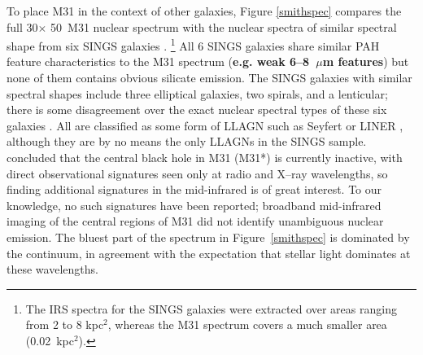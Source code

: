 To place M31 in the context of other galaxies,
Figure \ref{smithspec} compares the full 30\arcsec $\times$ 50\arcsec\ M31 nuclear spectrum with the 
nuclear spectra of similar spectral shape from six SINGS galaxies \citep{Smith:2007lr}.%
\footnote{The IRS spectra for the SINGS galaxies were extracted over areas ranging from 2 to 8 kpc$^2$, whereas the M31 spectrum covers a much smaller area (0.02~kpc$^2$).}
All 6 SINGS galaxies share similar PAH feature characteristics to the M31 spectrum ({\bf e.g. weak 6--8~$\mu$m features}) but none of them contains obvious silicate emission. 
The SINGS galaxies with similar spectral shapes include  three elliptical galaxies, two spirals, and a lenticular; there is some disagreement over the exact nuclear spectral types of these six galaxies \citep{kennicutt03,Smith:2007lr, moustakas2010}.  All are classified as some form of LLAGN
such as Seyfert or LINER \citep[luminous AGNs were intentionally omitted from the SINGS sample;][]{kennicutt03}, although they are
by no means the only LLAGNs in the SINGS sample.
\citet{Li09} concluded that the central black hole in M31 (M31*) is currently inactive, with direct observational signatures seen only
at radio and X--ray wavelengths, so finding additional signatures in the mid-infrared is of great interest.
To our knowledge, no such signatures have been reported; broadband mid-infrared imaging of the central 
regions of M31 \citep{davidge06,Barmby2006lr} did not identify unambiguous nuclear emission. The bluest
part of the spectrum in Figure~\ref{smithspec} is dominated by the continuum, in agreement with the
expectation that stellar light dominates at these wavelengths.


